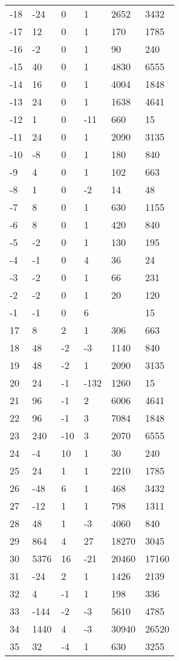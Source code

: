 \documentclass{amsart}
\begin{document}
\begin{longtable}{llllll}
-18 & -24 & 0 & 1 & 2652 & 3432\\
-17 & 12 & 0 & 1 & 170 & 1785\\
-16 & -2 & 0 & 1 & 90 & 240\\
-15 & 40 & 0 & 1 & 4830 & 6555\\
-14 & 16 & 0 & 1 & 4004 & 1848\\
-13 & 24 & 0 & 1 & 1638 & 4641\\
-12 & 1 & 0 & -11 & 660 & 15\\
-11 & 24 & 0 & 1 & 2090 & 3135\\
-10 & -8 & 0 & 1 & 180 & 840\\
-9 & 4 & 0 & 1 & 102 & 663\\
-8 & 1 & 0 & -2 & 14 & 48\\
-7 & 8 & 0 & 1 & 630 & 1155\\
-6 & 8 & 0 & 1 & 420 & 840\\
-5 & -2 & 0 & 1 & 130 & 195\\
-4 & -1 & 0 & 4 & 36 & 24\\
-3 & -2 & 0 & 1 & 66 & 231\\
-2 & -2 & 0 & 1 & 20 & 120\\
-1 & -1 & 0 & 6 &  & 15\\
17 & 8 & 2 & 1 & 306 & 663\\
18 & 48 & -2 & -3 & 1140 & 840\\
19 & 48 & -2 & 1 & 2090 & 3135\\
20 & 24 & -1 & -132 & 1260 & 15\\
21 & 96 & -1 & 2 & 6006 & 4641\\
22 & 96 & -1 & 3 & 7084 & 1848\\
23 & 240 & -10 & 3 & 2070 & 6555\\
24 & -4 & 10 & 1 & 30 & 240\\
25 & 24 & 1 & 1 & 2210 & 1785\\
26 & -48 & 6 & 1 & 468 & 3432\\
27 & -12 & 1 & 1 & 798 & 1311\\
28 & 48 & 1 & -3 & 4060 & 840\\
29 & 864 & 4 & 27 & 18270 & 3045\\
30 & 5376 & 16 & -21 & 20460 & 17160\\
31 & -24 & 2 & 1 & 1426 & 2139\\
32 & 4 & -1 & 1 & 198 & 336\\
33 & -144 & -2 & -3 & 5610 & 4785\\
34 & 1440 & 4 & -3 & 30940 & 26520\\
35 & 32 & -4 & 1 & 630 & 3255\\

\end{longtable}
\end{document}
